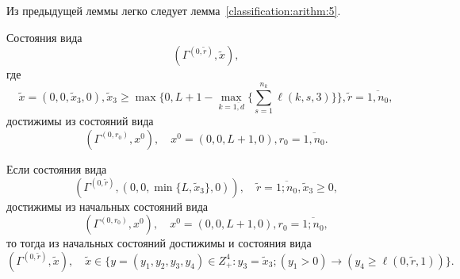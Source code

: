 Из предыдущей леммы легко следует лемма~\ref{classification:arithm:5}.
\begin{lemma}
Состояния вида 
$$
(\Gamma^{(0,  \tilde{r})},  \tilde{x}), 
$$
где 
$$
\tilde{x}=(0,  0,  \tilde{x}_3,  0),  \tilde{x}_3\geqslant \max{\{0,  L+1-\max_{k=\overline{1,  d}}{\{ \sum_{s=1}^{n_k}\ell(k,  s,  3)\}}\}}, 
\tilde{r} = \overline{1,  n_0}, 
$$
достижимы из состояний вида  
\begin{equation*}
(\Gamma^{(0,  r_0)},  x^0),  \quad x^0=(0,  0,  L+1,  0),   r_0=\overline{1,  n_0}.
\end{equation*}
\label{classification:arithm:5}
\end{lemma}
\begin{lemma}
Если состояния вида
$$
(\Gamma^{(0,  \tilde{r})},  (0,  0,  \min\{L,  \tilde{x}_3\},  0)),  \quad \tilde{r}=\overline{1; n_0},  \tilde{x}_3 \geqslant 0, 
$$
достижимы из начальных состояний вида
$$
(\Gamma^{(0,  r_0)},  x^0),  \quad x^0=(0,  0,  L+1,  0),  r_0=\overline{1; n_0}, 
$$
то тогда из начальных состояний достижимы и состояния вида
$$
(\Gamma^{(0,  \tilde{r})},  \tilde{x}),  \quad
 \tilde{x} \in \{y = (y_1,  y_2,  y_3,  y_4) \in Z_+^4\colon y_3=\tilde{x}_3; (y_1 > 0)\rightarrow (y_4\geqslant \ell(0,  \tilde{r},  1))\}.
 $$
 
\label{classification:arithm:6}
\end{lemma}

